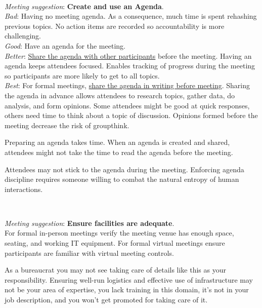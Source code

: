 \ \\
\begin{samepage}
\textit{Meeting suggestion}: \textbf{Create and use an Agenda}.\\
\textit{Bad}: Having no meeting agenda. As a consequence, much time is spent rehashing previous topics. No action items are recorded so accountability is more challenging. \\
\textit{Good}: Have an agenda for the meeting. \\
\textit{Better}: \underline{Share the agenda with other participants} before the meeting. Having an agenda keeps attendees focused.  Enables tracking of progress during the meeting so participants are more likely to get to all topics.\\
\textit{Best}: For formal meetings, \underline{share the agenda in writing before meeting}. Sharing the agenda in advance allows attendees to research topics, gather data, do analysis, and form opinions. Some attendees might be good at quick responses, others need time to think about a topic of discussion. Opinions formed before the meeting decrease the risk of groupthink. 
\end{samepage}

Preparing an agenda takes time. When an agenda is created and shared, attendees might not take the time to read the agenda before the meeting. 

Attendees may not stick to the agenda during the meeting. Enforcing agenda discipline requires someone willing to combat the natural entropy of human interactions. 


\ \\
\begin{samepage}
\textit{Meeting suggestion}: \textbf{Ensure facilities are adequate}.\\
For formal in-person meetings verify the meeting venue has enough space, seating, and working IT equipment. For formal virtual meetings ensure participants are familiar with virtual meeting controls. 
\end{samepage}

As a bureaucrat you may not see taking care of details like this as your responsibility. Ensuring well-run logistics and effective use of infrastructure may not be your area of expertise, you lack training in this domain, it's not in your job description, and you won't get promoted for taking care of it. 

